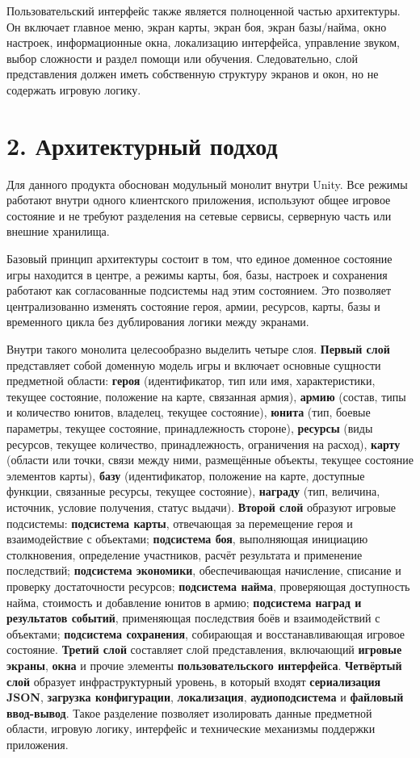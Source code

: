\documentclass[12pt,a4paper]{article}
\begin{document}
Пользовательский интерфейс также является полноценной частью архитектуры. Он включает главное меню, экран карты, экран боя, экран базы/найма, окно настроек, информационные окна, локализацию интерфейса, управление звуком, выбор сложности и раздел помощи или обучения. Следовательно, слой представления должен иметь собственную структуру экранов и окон, но не содержать игровую логику.

\section*{2. Архитектурный подход}

Для данного продукта обоснован модульный монолит внутри Unity. Все режимы работают внутри одного клиентского приложения, используют общее игровое состояние и не требуют разделения на сетевые сервисы, серверную часть или внешние хранилища.

Базовый принцип архитектуры состоит в том, что единое доменное состояние игры находится в центре, а режимы карты, боя, базы, настроек и сохранения работают как согласованные подсистемы над этим состоянием. Это позволяет централизованно изменять состояние героя, армии, ресурсов, карты, базы и временного цикла без дублирования логики между экранами.

Внутри такого монолита целесообразно выделить четыре слоя. \textbf{Первый слой} представляет собой доменную модель игры и включает основные сущности предметной области: \textbf{героя} (идентификатор, тип или имя, характеристики, текущее состояние, положение на карте, связанная армия), \textbf{армию} (состав, типы и количество юнитов, владелец, текущее состояние), \textbf{юнита} (тип, боевые параметры, текущее состояние, принадлежность стороне), \textbf{ресурсы} (виды ресурсов, текущее количество, принадлежность, ограничения на расход), \textbf{карту} (области или точки, связи между ними, размещённые объекты, текущее состояние элементов карты), \textbf{базу} (идентификатор, положение на карте, доступные функции, связанные ресурсы, текущее состояние), \textbf{награду} (тип, величина, источник, условие получения, статус выдачи). \textbf{Второй слой} образуют игровые подсистемы: \textbf{подсистема карты}, отвечающая за перемещение героя и взаимодействие с объектами; \textbf{подсистема боя}, выполняющая инициацию столкновения, определение участников, расчёт результата и применение последствий; \textbf{подсистема экономики}, обеспечивающая начисление, списание и проверку достаточности ресурсов; \textbf{подсистема найма}, проверяющая доступность найма, стоимость и добавление юнитов в армию; \textbf{подсистема наград и результатов событий}, применяющая последствия боёв и взаимодействий с объектами; \textbf{подсистема сохранения}, собирающая и восстанавливающая игровое состояние. \textbf{Третий слой} составляет слой представления, включающий \textbf{игровые экраны}, \textbf{окна} и прочие элементы \textbf{пользовательского интерфейса}. \textbf{Четвёртый слой} образует инфраструктурный уровень, в который входят \textbf{сериализация JSON}, \textbf{загрузка конфигурации}, \textbf{локализация}, \textbf{аудиоподсистема} и \textbf{файловый ввод-вывод}. Такое разделение позволяет изолировать данные предметной области, игровую логику, интерфейс и технические механизмы поддержки приложения.
\end{document}
